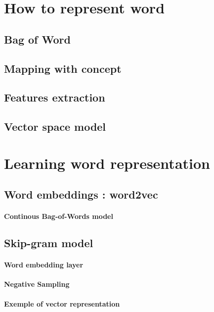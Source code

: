 	\section{How to represent word}

		\subsection{Bag of Word}

		\subsection{Mapping with concept}

		\subsection{Features extraction}

		\subsection{Vector space model}

	\section{Learning word representation}

		\subsection{Word embeddings : word2vec}
			\paragraph*{Continous Bag-of-Words model}

		\subsection*{Skip-gram model}

			\paragraph{Word embedding layer}

			\paragraph*{Negative Sampling}

			\paragraph*{Exemple of vector representation}
		
